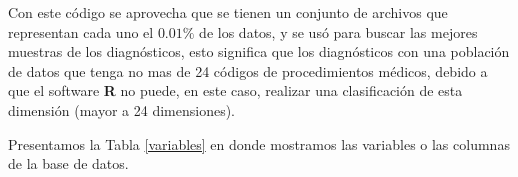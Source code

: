   
  
  Con este código se aprovecha que se tienen un conjunto de archivos que representan cada uno el $0.01\%$ de los datos, y se usó para buscar las mejores muestras de los diagnósticos, esto significa que los diagnósticos con una población de datos que tenga no mas de 24 códigos de procedimientos médicos, debido a que el software \textbf{R} no puede, en este caso, realizar una clasificación de esta dimensión (mayor a 24 dimensiones).
 
 Presentamos la Tabla \ref{variables} en donde mostramos las variables o las columnas de la base de datos.
 
